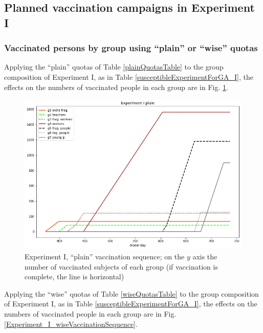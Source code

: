 \documentclass[graybox]{svmult}
\begin{document}
\subsection{Planned vaccination campaigns in Experiment I}

\subsubsection{Vaccinated persons by group using ``plain'' or ``wise'' quotas}

Applying the ``plain'' quotas of Table \ref{plainQuotasTable} to the group composition of Experiment I, as in Table \ref{susceptibleExperimentForGA_I}, the effects on the numbers of vaccinated people in each group are in Fig. \ref{Experiment_I_plainVaccinationSequence}.

\begin{figure}[t]
\center
\includegraphics[scale=0.45]{Experiment_I_plainVaccinationSequence.png} %

\caption{Experiment I, ``plain'' vaccination sequence; on the $y$ axis the number of vaccinated subjects of each group (if vaccination is complete, the line is horizontal)} 
\label{Experiment_I_plainVaccinationSequence}
\end{figure}


Applying the ``wise'' quotas of Table \ref{wiseQuotasTable} to the group composition of Experiment I, as in Table \ref{susceptibleExperimentForGA_I}, the effects on the numbers of vaccinated people in each group are in Fig. \ref{Experiment_I_wiseVaccinationSequence}.
\end{document}
